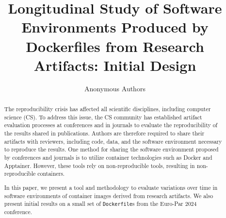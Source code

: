 \documentclass[sigconf,natbib=false]{acmart}
\newcommand{\df}{\texttt{Dockerfile}}
\begin{document}
\title{%
  Longitudinal Study of Software Environments Produced by Dockerfiles from Research Artifacts: Initial Design%
}


% 
% 

\author{Anonymous Authors}



\begin{abstract}
  The reproducibility crisis has affected all scientific disciplines, including computer science (CS).
  To address this issue, the CS community has established artifact evaluation processes at conferences and in journals to evaluate the reproducibility of the results shared in publications.
  Authors are therefore required to share their artifacts with reviewers, including code, data, and the software environment necessary to reproduce the results.
  One method for sharing the software environment proposed by conferences and journals is to utilize container technologies such as Docker and Apptainer.
  However, these tools rely on non-reproducible tools, resulting in non-reproducible containers.

  In this paper, we present a tool and methodology to evaluate variations over time in software environments of container images derived from research artifacts.
  We also present initial results on a small set of \df s from the Euro-Par 2024 conference.
 
\end{abstract}
\end{document}
